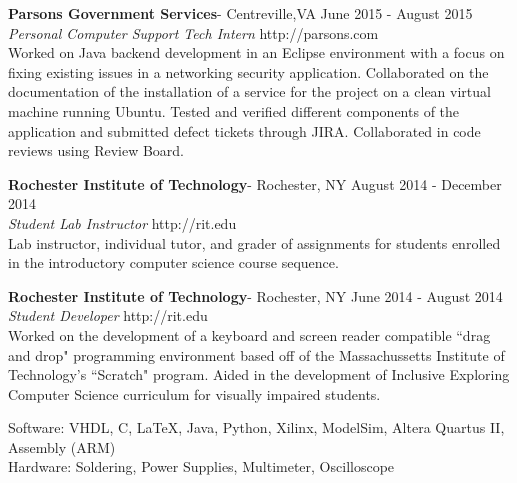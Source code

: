 \documentclass[10pt]{article} %
\begin{document}

\newline
	\textbf{Parsons Government Services}- Centreville,VA			\hfill June 2015 - August 2015 \\
	\textit{Personal Computer Support Tech Intern}	\hfill http://parsons.com \\
	\indent Worked on Java backend development in an Eclipse environment with a focus on fixing existing issues in a networking security application.  Collaborated on the documentation of the installation of a service for the project on a clean virtual machine running Ubuntu.  Tested and verified different components of the application and submitted defect tickets through JIRA.  Collaborated in code reviews using Review Board.
	
	\medskip

	\noindent \textbf{Rochester Institute of Technology}- Rochester, NY 		\hfill August 2014 - December 2014 \\
	\textit{Student Lab Instructor}								\hfill http://rit.edu \\
	\indent Lab instructor, individual tutor, and grader of assignments for students enrolled in the introductory computer science course sequence.
	
	\medskip

	\noindent \textbf{Rochester Institute of Technology}- Rochester, NY 	\hfill June 2014 - August 2014 \\
	\textit{Student Developer}									\hfill http://rit.edu \\
	\indent Worked on the development of a keyboard and screen reader compatible ``drag and drop" programming environment based off of the Massachussetts Institute of Technology's ``Scratch" program.  Aided in the development of Inclusive Exploring Computer Science curriculum for visually impaired students.


\bigskip


\newline
	Software: VHDL, C, \LaTeX, Java, Python, Xilinx, ModelSim, Altera Quartus II, Assembly (ARM)\\
	Hardware: Soldering, Power Supplies, Multimeter, Oscilloscope
\end{document}
